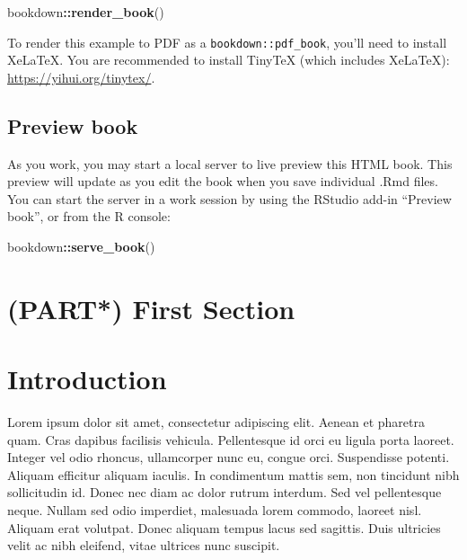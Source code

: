 \documentclass[
]{book}
\newenvironment{Shaded}{\begin{snugshade}}{\end{snugshade}}
\newcommand{\FunctionTok}[1]{\textcolor[rgb]{0.13,0.29,0.53}{\textbf{#1}}}
\newcommand{\NormalTok}[1]{#1}
\newcommand{\SpecialCharTok}[1]{\textcolor[rgb]{0.81,0.36,0.00}{\textbf{#1}}}
\begin{document}
\begin{Shaded}
\begin{Highlighting}[]
\NormalTok{bookdown}\SpecialCharTok{::}\FunctionTok{render\_book}\NormalTok{()}
\end{Highlighting}
\end{Shaded}

To render this example to PDF as a \texttt{bookdown::pdf\_book}, you'll need to install XeLaTeX. You are recommended to install TinyTeX (which includes XeLaTeX): \url{https://yihui.org/tinytex/}.

\hypertarget{preview-book}{%
\section{Preview book}\label{preview-book}}

As you work, you may start a local server to live preview this HTML book. This preview will update as you edit the book when you save individual .Rmd files. You can start the server in a work session by using the RStudio add-in ``Preview book'', or from the R console:

\begin{Shaded}
\begin{Highlighting}[]
\NormalTok{bookdown}\SpecialCharTok{::}\FunctionTok{serve\_book}\NormalTok{()}
\end{Highlighting}
\end{Shaded}

\hypertarget{part-first-section}{%
\chapter{(PART*) First Section}\label{part-first-section}}

\hypertarget{introduction}{%
\chapter{Introduction}\label{introduction}}

Lorem ipsum dolor sit amet, consectetur adipiscing elit. Aenean et pharetra quam. Cras dapibus facilisis vehicula. Pellentesque id orci eu ligula porta laoreet. Integer vel odio rhoncus, ullamcorper nunc eu, congue orci. Suspendisse potenti. Aliquam efficitur aliquam iaculis. In condimentum mattis sem, non tincidunt nibh sollicitudin id. Donec nec diam ac dolor rutrum interdum. Sed vel pellentesque neque. Nullam sed odio imperdiet, malesuada lorem commodo, laoreet nisl. Aliquam erat volutpat. Donec aliquam tempus lacus sed sagittis. Duis ultricies velit ac nibh eleifend, vitae ultrices nunc suscipit.
\end{document}
